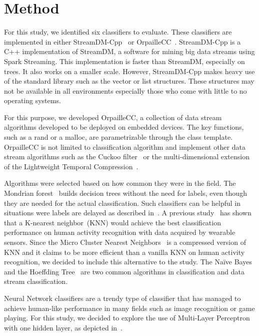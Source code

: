 \section{Method}
For this study, we identified six classifiers to
evaluate. These classifiers are implemented in
either StreamDM-Cpp~\cite{streamDM} or
OrpailleCC~\cite{OrpailleCC}.  StreamDM-Cpp is a
C++ implementation of StreamDM, a
software for mining big data streams using Spark
Streaming. This implementation is faster than
StreamDM, especially on trees. It also works on a
smaller scale. However, StreamDM-Cpp makes heavy
use of the standard library such as the vector or
list structures. These structures may not be
available in all environments especially those who
come with little to no operating systems.

For this purpose, we developed OrpailleCC, a
collection of data stream algorithms developed to
be deployed on embedded devices. The key
functions, such as a rand or a malloc, are
parametrizable through the class template.
OrpailleCC is not limited to classification
algorithm and implement other data stream
algorithms such as the Cuckoo filter~\cite{cuckoo}
or the multi-dimensional extension of the
Lightweight Temporal Compression~\cite{multi-ltc}.

Algorithms were selected based on how common they
were in the field. The Mondrian
forest~\cite{mondrian2014} builds decision trees
without the need for labels, even though they are
needed for the actual classification. Such
classifiers can be helpful in situations were
labels are delayed as described
in~\cite{stream_learning_review}.  A previous
study~\cite{Janidarmian_2017} has shown that a
K-nearest neighbor~(KNN) would achieve the best
classification performance on human activity
recognition with data acquired by wearable
sensors. Since the Micro Cluster Nearest
Neighbors~\cite{mc-nn} is a compressed version of
KNN and it claims to be more efficient than a
vanilla KNN on human activity recognition, we decided
to include this alternative to the study.  The
Naïve Bayes~\cite{naive_bayes} and the Hoeffding
Tree~\cite{VFDT} are two common algorithms in
classification and data stream classification.

Neural Network classifiers are a trendy type of
classifier that has managed to achieve
human-like performance in many fields such as
image recognition or game playing. For this study,
we decided to explore the use of Multi-Layer
Perceptron with one hidden layer, as depicted
in~\cite{omid_2019}.


